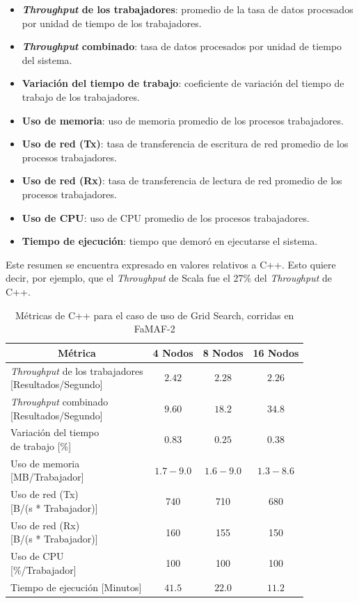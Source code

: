 \documentclass[11pt]{article}
\providecommand{\row}[1]{\parbox{150pt}{\setlength{\baselineskip}{0.2\baselineskip}\strut#1\strut}}
\newcommand{\gscap}[2]{\caption{Métricas de #1 para el caso de uso de Grid Search, corridas en #2}}
\newcommand{\english}[1]{\textit{#1}}
\begin{document}
\begin{itemize}
    \item \textbf{\english{Throughput} de los trabajadores}: promedio de la tasa de datos procesados por unidad de tiempo de los trabajadores.
    \item \textbf{\english{Throughput} combinado}: tasa de datos procesados por unidad de tiempo del sistema.
    \item \textbf{Variación  del tiempo de trabajo}: coeficiente de variación del tiempo de trabajo de los trabajadores.
    \item \textbf{Uso de memoria}: uso de memoria promedio de los procesos trabajadores.
    \item \textbf{Uso de red (Tx)}: tasa de transferencia de escritura de red promedio de los procesos trabajadores.
    \item \textbf{Uso de red (Rx)}: tasa de transferencia de lectura de red promedio de los procesos trabajadores.
    \item \textbf{Uso de CPU}: uso de CPU promedio de los procesos trabajadores.
    \item \textbf{Tiempo de ejecución}: tiempo que demoró en ejecutarse el sistema.
\end{itemize}

Este resumen se encuentra expresado en valores relativos a C++. Esto quiere decir, por ejemplo, que el \english{Throughput} de Scala fue el 27\% del \english{Throughput} de C++.

\begin{table}[H]
\centering
\begin{tabular}{|l|c|c|c|}
\hline
\multicolumn{1}{|c|}{Métrica} & 4 Nodos & 8 Nodos & 16 Nodos \\ \hline
\row{\english{Throughput} de los trabajadores\\{[Resultados/Segundo]}} & $2.42$  & $2.28$ & $2.26$ \\ \hline
\row{\english{Throughput} combinado\\{[Resultados/Segundo]}}  & $9.60$  & $18.2$ & $34.8$ \\ \hline
\row{Variación del tiempo\\de trabajo {[\%]}} & $0.83$& $0.25$& $0.38$\\ \hline
\row{Uso de memoria\\{[MB/Trabajador]}} & $1.7-9.0$  & $1.6-9.0$ & $1.3-8.6$ \\ \hline
\row{Uso de red (Tx)\\{[B/(s * Trabajador)]}} & 740 & 710 & 680 \\ \hline
\row{Uso de red (Rx)\\{[B/(s * Trabajador)]}} & 160 & 155 & 150 \\ \hline
\row{Uso de CPU\\{[\%/Trabajador]}} & 100 & 100 & 100 \\ \hline
Tiempo de ejecución [Minutos] & $41.5$ & $22.0$ & $11.2$ \\ \hline
\end{tabular}
\gscap{C++}{FaMAF-2}
\end{table}
\end{document}
